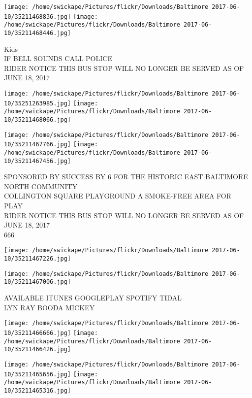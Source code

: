 \documentclass[10pt,letterpaper]{article}
\begin{document}
\vspace{0.25in}
\texttt{[image: /home/swickape/Pictures/flickr/Downloads/Baltimore 2017-06-10/35211468836.jpg]}
\texttt{[image: /home/swickape/Pictures/flickr/Downloads/Baltimore 2017-06-10/35211468446.jpg]}

Kids\\
IF BELL SOUNDS CALL POLICE\\
RIDER NOTICE THIS BUS STOP WILL NO LONGER BE SERVED AS OF JUNE 18, 2017\\
\pagebreak

\texttt{[image: /home/swickape/Pictures/flickr/Downloads/Baltimore 2017-06-10/35251263985.jpg]}
\texttt{[image: /home/swickape/Pictures/flickr/Downloads/Baltimore 2017-06-10/35211468066.jpg]}

\texttt{[image: /home/swickape/Pictures/flickr/Downloads/Baltimore 2017-06-10/35211467766.jpg]}
\texttt{[image: /home/swickape/Pictures/flickr/Downloads/Baltimore 2017-06-10/35211467456.jpg]}

SPONSORED BY SUCCESS BY 6 FOR THE HISTORIC EAST BALTIMORE NORTH COMMUNITY\\
COLLINGTON SQUARE PLAYGROUND A SMOKE{-}FREE AREA FOR PLAY\\
RIDER NOTICE THIS BUS STOP WILL NO LONGER BE SERVED AS OF JUNE 18, 2017\\
666\\
\pagebreak

\texttt{[image: /home/swickape/Pictures/flickr/Downloads/Baltimore 2017-06-10/35211467226.jpg]}

\vspace{0.25in}
\texttt{[image: /home/swickape/Pictures/flickr/Downloads/Baltimore 2017-06-10/35211467006.jpg]}

AVAILABLE ITUNES GOOGLEPLAY SPOTIFY TIDAL\\
LYN RAY BOODA MICKEY\\
\pagebreak

\texttt{[image: /home/swickape/Pictures/flickr/Downloads/Baltimore 2017-06-10/35211466666.jpg]}
\texttt{[image: /home/swickape/Pictures/flickr/Downloads/Baltimore 2017-06-10/35211466426.jpg]}

\texttt{[image: /home/swickape/Pictures/flickr/Downloads/Baltimore 2017-06-10/35211465656.jpg]}
\texttt{[image: /home/swickape/Pictures/flickr/Downloads/Baltimore 2017-06-10/35211465316.jpg]}
\end{document}
